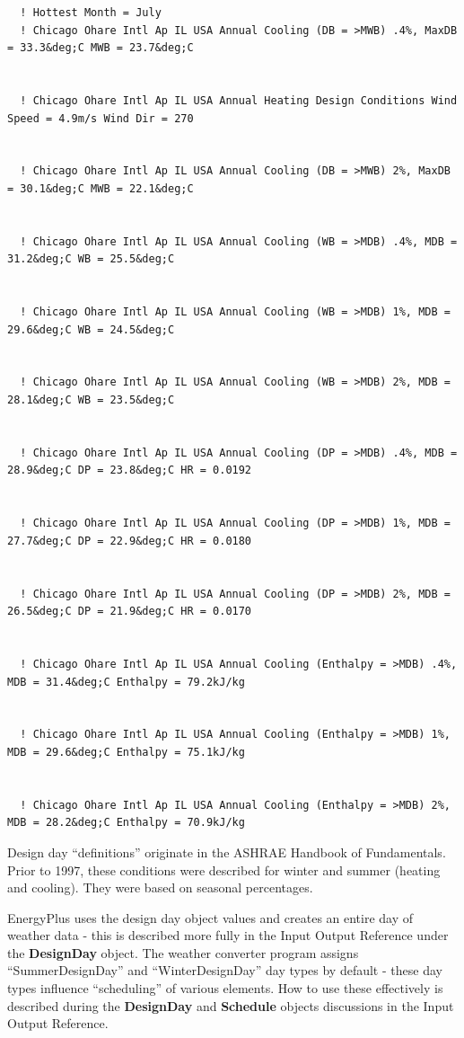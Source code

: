 \begin{lstlisting}
  ! Hottest Month = July
  ! Chicago Ohare Intl Ap IL USA Annual Cooling (DB = >MWB) .4%, MaxDB = 33.3&deg;C MWB = 23.7&deg;C


  ! Chicago Ohare Intl Ap IL USA Annual Heating Design Conditions Wind Speed = 4.9m/s Wind Dir = 270


  ! Chicago Ohare Intl Ap IL USA Annual Cooling (DB = >MWB) 2%, MaxDB = 30.1&deg;C MWB = 22.1&deg;C


  ! Chicago Ohare Intl Ap IL USA Annual Cooling (WB = >MDB) .4%, MDB = 31.2&deg;C WB = 25.5&deg;C


  ! Chicago Ohare Intl Ap IL USA Annual Cooling (WB = >MDB) 1%, MDB = 29.6&deg;C WB = 24.5&deg;C


  ! Chicago Ohare Intl Ap IL USA Annual Cooling (WB = >MDB) 2%, MDB = 28.1&deg;C WB = 23.5&deg;C


  ! Chicago Ohare Intl Ap IL USA Annual Cooling (DP = >MDB) .4%, MDB = 28.9&deg;C DP = 23.8&deg;C HR = 0.0192


  ! Chicago Ohare Intl Ap IL USA Annual Cooling (DP = >MDB) 1%, MDB = 27.7&deg;C DP = 22.9&deg;C HR = 0.0180


  ! Chicago Ohare Intl Ap IL USA Annual Cooling (DP = >MDB) 2%, MDB = 26.5&deg;C DP = 21.9&deg;C HR = 0.0170


  ! Chicago Ohare Intl Ap IL USA Annual Cooling (Enthalpy = >MDB) .4%, MDB = 31.4&deg;C Enthalpy = 79.2kJ/kg


  ! Chicago Ohare Intl Ap IL USA Annual Cooling (Enthalpy = >MDB) 1%, MDB = 29.6&deg;C Enthalpy = 75.1kJ/kg


  ! Chicago Ohare Intl Ap IL USA Annual Cooling (Enthalpy = >MDB) 2%, MDB = 28.2&deg;C Enthalpy = 70.9kJ/kg
\end{lstlisting}

Design day ``definitions'' originate in the ASHRAE Handbook of Fundamentals. Prior to 1997, these conditions were described for winter and summer (heating and cooling). They were based on seasonal percentages.

EnergyPlus uses the design day object values and creates an entire day of weather data - this is described more fully in the Input Output Reference under the \textbf{DesignDay} object. The weather converter program assigns ``SummerDesignDay'' and ``WinterDesignDay'' day types by default - these day types influence ``scheduling'' of various elements. How to use these effectively is described during the \textbf{DesignDay} and \textbf{Schedule} objects discussions in the Input Output Reference.

